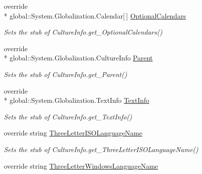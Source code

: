 \begin{DoxyCompactItemize}
override \\*
global\-::\-System.\-Globalization.\-Calendar\mbox{[}$\,$\mbox{]} \hyperlink{class_system_1_1_globalization_1_1_fakes_1_1_stub_culture_info_a19f771049e261edc46e41592723b0676}{Optional\-Calendars}
\begin{DoxyCompactList}\small\item\em Sets the stub of Culture\-Info.\-get\-\_\-\-Optional\-Calendars()\end{DoxyCompactList}\item 
override \\*
global\-::\-System.\-Globalization.\-Culture\-Info \hyperlink{class_system_1_1_globalization_1_1_fakes_1_1_stub_culture_info_a10abdb788a096a54c4ce2b0fcd9c678e}{Parent}
\begin{DoxyCompactList}\small\item\em Sets the stub of Culture\-Info.\-get\-\_\-\-Parent()\end{DoxyCompactList}\item 
override \\*
global\-::\-System.\-Globalization.\-Text\-Info \hyperlink{class_system_1_1_globalization_1_1_fakes_1_1_stub_culture_info_a2be10135b4140c4ac3ec0b902661846a}{Text\-Info}
\begin{DoxyCompactList}\small\item\em Sets the stub of Culture\-Info.\-get\-\_\-\-Text\-Info()\end{DoxyCompactList}\item 
override string \hyperlink{class_system_1_1_globalization_1_1_fakes_1_1_stub_culture_info_ac78ca943306a03273281a4658c435e98}{Three\-Letter\-I\-S\-O\-Language\-Name}
\begin{DoxyCompactList}\small\item\em Sets the stub of Culture\-Info.\-get\-\_\-\-Three\-Letter\-I\-S\-O\-Language\-Name()\end{DoxyCompactList}\item 
override string \hyperlink{class_system_1_1_globalization_1_1_fakes_1_1_stub_culture_info_a3b647a11fd14f0127bd9d9ddbc4a8651}{Three\-Letter\-Windows\-Language\-Name}

\end{DoxyCompactItemize}
